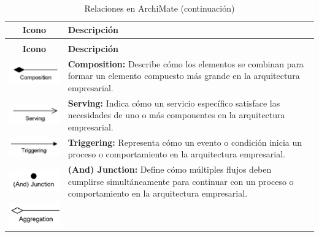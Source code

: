 \begin{longtable}{|c|p{8cm}|}
\caption{Relaciones en ArchiMate} \label{tab:relaciones-archimate} \\
\hline
\textbf{Icono} & \textbf{Descripción} \\
\hline
\endfirsthead

\caption[]{Relaciones en ArchiMate (continuación)} \\
\hline
\textbf{Icono} & \textbf{Descripción} \\
\hline
\endhead

\hline
\endfoot

\endlastfoot
\includegraphics{apendices/ARCHI/relations/compostion.png} & 
\textbf{Composition:} Describe cómo los elementos se combinan para formar un elemento compuesto más grande en la arquitectura empresarial. \\
\hline
\includegraphics{apendices/ARCHI/relations/serving.png} & 
\textbf{Serving:} Indica cómo un servicio específico satisface las necesidades de uno o más componentes en la arquitectura empresarial. \\
\hline
\includegraphics{apendices/ARCHI/relations/triggering.png} & 
\textbf{Triggering:} Representa cómo un evento o condición inicia un proceso o comportamiento en la arquitectura empresarial. \\
\hline
\includegraphics{apendices/ARCHI/relations/and.png} & 
\textbf{(And) Junction:} Define cómo múltiples flujos deben cumplirse simultáneamente para continuar con un proceso o comportamiento en la arquitectura empresarial. \\
\hline
\includegraphics{apendices/ARCHI/relations/aggregation.png} & 

\end{longtable}
